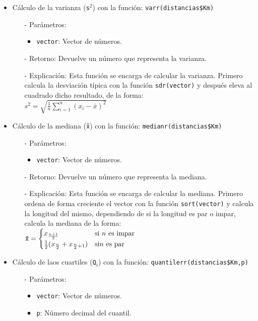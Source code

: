 \documentclass[a4paper, 12pt]{article}
\begin{document}
\begin{itemize}
		\item Cálculo de la varianza (\texttt{s$^2$}) con la función: \texttt{varr(distancias\$Km)}
		\begin{itemize}
			\item[-] Parámetros: 
			\begin{itemize}
				\item \texttt{vector}: Vector de números.
			\end{itemize}
			
			\item[-] Retorno: Devuelve un número que representa la varianza. 
			
			\item[-] Explicación: Esta función se encarga de calcular la varianza. Primero calcula la desviación típica con la función \texttt{sdr(vector)} y después eleva al cuadrado dicho resultado, de la forma: \\
			$s^2 = \sqrt{\frac{1}{n} \sum_{i=1}^{n} (x_i - \bar{x})^2}$
		\end{itemize}
		
		\item Cálculo de la mediana (\texttt{\~{x}}) con la función: \texttt{medianr(distancias\$Km)}
		\begin{itemize}
			\item[-] Parámetros: 
			\begin{itemize}
				\item \texttt{vector}: Vector de números.
			\end{itemize}
			
			\item[-] Retorno: Devuelve un número que representa la mediana. 
			
			\item[-] Explicación: Esta función se encarga de calcular la mediana. Primero ordena de forma creciente el vector con la función \texttt{sort(vector)} y calcula la longitud del mismo, dependiendo de si la longitud es par o impar, calcula la mediana de la forma: \\
			$\text{\texttt{\~{x}}} = \begin{cases} 
				x_{\frac{n+1}{2}} & \text{si } n \text{ es impar} \\
				\frac{1}{2}(x_{\frac{n}{2}} + x_{\frac{n}{2}+1}) & \text{si} n \text{ es par}
			\end{cases}$
		\end{itemize}
		
		\item Cálculo de laos cuartiles (\texttt{Q$_{i}$}) con la función: \texttt{quantilerr(distancias\$Km,p)}
		\begin{itemize}
			\item[-] Parámetros: 
			\begin{itemize}
				\item \texttt{vector}: Vector de números.
				\item \texttt{p}: Número decimal del cuantil.
			\end{itemize}
			

\end{itemize}
\end{itemize}
\end{document}
